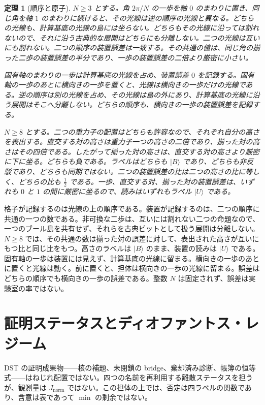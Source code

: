 \documentclass[a4paper]{article}
\newtheorem{theorem}{定理}[section]
\theoremstyle{definition}
\newcommand{\Jnorm}{J_{\mathrm{norm}}}
\begin{document}
\begin{theorem}[順序と原子]
\label{thm:order}
\(N\ge 3\) とする。角 \(2\pi/N\) の一歩を軸 \(0\) のまわりに置き、同じ角を軸 \(1\) のまわりに続けると、その光線は逆の順序の光線と異なる。どちらの光線も、計算基底の光線の島には坐らない。どちらもその光線に沿っては割れないので、それに沿う古典的な展開はどちらにも分離しない。二つの光線は互いにも割れない。二つの順序の装置誤差は一致する。その共通の値は、同じ角の揃った二歩の装置誤差の半分であり、一歩の装置誤差の二倍より厳密に小さい。

固有軸のまわりの一歩は計算基底の光線を占め、装置誤差 \(0\) を記録する。固有軸の一歩のあとに横向きの一歩を置くと、光線は横向きの一歩だけの光線である。逆の順序は別の光線を占め、その光線は島の外にあり、計算基底の光線に沿う展開はそこへ分離しない。どちらの順序も、横向きの一歩の装置誤差を記録する。

\(N\ge 8\) とする。二つの重力子の配置はどちらも許容なので、それぞれ自分の高さを表出する。直交する対の高さは重力子一つの高さの二倍であり、揃った対の高さはその四倍である。したがって揃った対の高さは、直交する対の高さより厳密に下に坐る。どちらも負である。ラベルはどちらも \(\lvert B\rangle\) であり、どちらも非反駁であり、どちらも同期ではない。二つの装置誤差の比は二つの高さの比に等しく、どちらの比も \(\frac12\) である。一歩、直交する対、揃った対の装置誤差は、いずれも \(0\) と \(1\) の間に厳密に坐るので、読みはいずれもラベル \(\lvert U\rangle\) である。
\end{theorem}

格子が記録するのは光線の上の順序である。装置が記録するのは、二つの順序に共通の一つの数である。非可換な二歩は、互いには割れない二つの命題なので、一つのブール島を共有せず、それらを古典ビットとして扱う展開は分離しない。\(N\ge 8\) では、その共通の数は揃った対の誤差に対して、表出された高さが互いにもつ比と同じ比をもつ。高さのラベルは \(\lvert B\rangle\) のまま、装置の読みは \(\lvert U\rangle\) である。固有軸の一歩は装置には見えず、計算基底の光線に留まる。横向きの一歩のあとに置くと光線は動く。前に置くと、担体は横向きの一歩の光線に留まる。誤差はどちらの順序でも横向きの一歩の誤差である。整数 \(N\) は固定されず、誤差は実験室の率ではない。

\section{証明ステータスとディオファントス・レジーム}
\label{sec:regime}

DST の証明成果物——核の補題、未閉鎖の bridge、棄却済み診断、帳簿の恒等式——はねじれ配置ではない。四つの名前を再利用する離散ステータスを担うが、観測量は \(\Jnorm\) ではない。この担体の上では、否定は四ラベルの関数であり、含意は表であって \(\min\) の剰余ではない。
\end{document}
